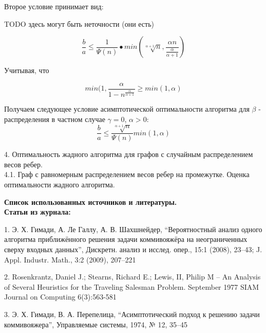 \documentclass[a4paper, 14pt]{extarticle}
\begin{document}
Второе условие принимает вид:

TODO здесь могут быть неточности (они есть)

\begin{equation}
\frac{b}{a} \leq \frac{1}{\Psi(n)}•min(\sqrt[\alpha+1]{n}, \frac{\alpha n}{\frac{\alpha}{\alpha+1}})
\end{equation}

Учитывая, что

\begin{equation}
min(1, \frac{\alpha}{1-n^{\frac{\alpha}{\alpha+1}}} \geq min(1, \alpha)
\end{equation}

Получаем следующее условие асимптотической оптимальности алгоритма \text{\algorithm} для $\beta$ - распределения в частном случае $\gamma=0$, $\alpha>0$:
\begin{equation}
\frac{b}{a} \leq \frac{\sqrt[\alpha+1]{n}}{\Psi(n)}min(1,\alpha)
\end{equation}




4. Оптимальность жадного алгоритма для графов с случайным распределением весов ребер. \\

4.1. Граф с равномерным распределением весов ребер на промежутке. Оценка оптимальности жадного алгоритма.



\newpage
\textbf{Список использованных источников и литературы.}\\

\textbf{Статьи из журнала:}

1. 	Э. Х. Гимади, А. Ле Галлу, А. В. Шахшнейдер, “Вероятностный анализ одного алгоритма приближённого решения задачи коммивояжёра на неограниченных сверху входных данных”, Дискретн. анализ и исслед. опер., 15:1 (2008), 23–43; J. Appl. Industr. Math., 3:2 (2009), 207–221

2. Rosenkrantz, Daniel J.; Stearns, Richard E.; Lewis, II, Philip M -- An Analysis of Several Heuristics for the Traveling Salesman Problem. September 1977 SIAM Journal on Computing 6(3):563-581

3. 	Э. Х. Гимади, В. А. Перепелица, “Асимптотический подход к решению задачи коммивояжера”, Управляемые системы, 1974, № 12, 35–45
\end{document}
